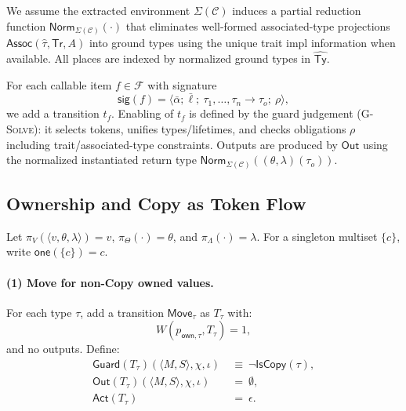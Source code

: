 \documentclass[runningheads]{llncs}
\begin{document}
We assume the extracted environment $\Sigma(\mathcal{C})$ induces a partial reduction function $\mathsf{Norm}_{\Sigma(\mathcal{C})}(\cdot)$ that eliminates well-formed associated-type projections $\mathsf{Assoc}(\hat\tau,\mathsf{Tr},A)$ into ground types using the unique trait impl information when available.
All places are indexed by normalized ground types in $\widehat{\mathsf{Ty}}$.

For each callable item $f\in\mathcal{F}$ with signature
\begin{equation*}
        \mathsf{sig}(f)=\langle \bar\alpha;\bar\ell;\ \tau_1,\dots,\tau_n \to \tau_o;\ \rho\rangle,
\end{equation*}
we add a transition $t_f$. Enabling of $t_f$ is defined by the guard judgement (\textsc{G-Solve}): it selects tokens, unifies types/lifetimes, and checks obligations $\rho$ including trait/associated-type constraints. Outputs are produced by $\mathsf{Out}$ using the normalized instantiated return type
$\mathsf{Norm}_{\Sigma(\mathcal{C})}((\theta,\lambda)(\tau_o))$.


\subsection{Ownership and Copy as Token Flow}
\label{sec:method:ownership}
Let $\pi_V(\langle v,\theta,\lambda\rangle)=v$, $\pi_\Theta(\cdot)=\theta$, and $\pi_\Lambda(\cdot)=\lambda$.
For a singleton multiset $\{c\}$, write $\mathsf{one}(\{c\})=c$.

\paragraph{(1) Move for non-Copy owned values.}
For each type $\tau$, add a transition $\mathsf{Move}_\tau$ as $T_{\tau}$ with:
\begin{equation*}
    W(p_{\mathsf{own},\tau},T_\tau)=1,
\end{equation*}
and no outputs. Define:
\begin{align*}
\mathsf{Guard}(T_\tau)(\langle M,S\rangle,\chi,\iota)
&~\equiv~ \neg \mathsf{IsCopy}(\tau),\\
\mathsf{Out}(T_\tau)(\langle M,S\rangle,\chi,\iota)
&~=~ \emptyset,\\
\mathsf{Act}(T_\tau)
&~=~ \epsilon.
\end{align*}
\end{document}
